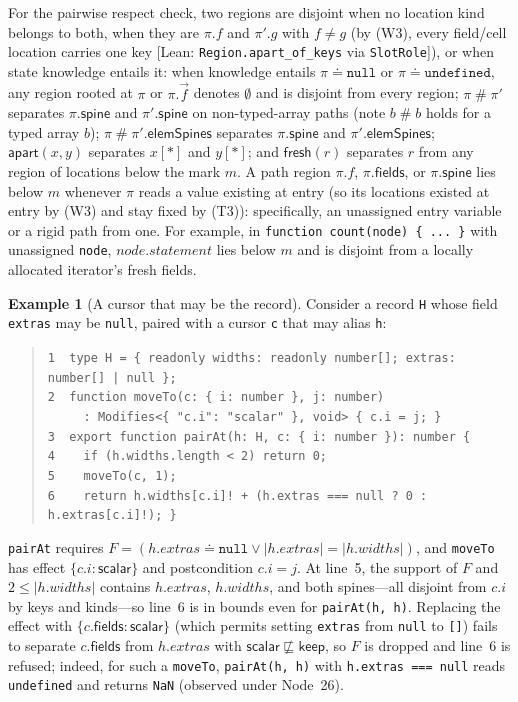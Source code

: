 \documentclass[10pt,a4paper]{article}
\theoremstyle{definition}
\newtheorem{example}[theorem]{Example}
\theoremstyle{remark}
\newcommand{\sep}{\mathrel{\#}}
\newcommand{\kw}[1]{\mathsf{#1}}
\newcommand{\keep}{\kw{keep}}
\newcommand{\fresh}{\kw{fresh}}
\newcommand{\apart}{\kw{apart}}
\newcommand{\len}[1]{|#1|}
\newcommand{\code}[1]{\texttt{#1}}
\newcommand{\lean}[1]{\texttt{\small #1}}
\newcommand{\status}[1]{\textsf{\small[#1]}}
\begin{document}
\noindent
For the pairwise respect check, two regions are disjoint when no location
kind belongs to both, when they are $\pi.f$ and $\pi'.g$ with $f\ne g$
(by (W3), every field/cell location carries one key
\status{Lean: \lean{Region.apart\_of\_keys} via \lean{SlotRole}}), or
when state knowledge entails it: when knowledge entails
$\pi\doteq\code{null}$ or $\pi\doteq\code{undefined}$, any region rooted
at $\pi$ or $\pi.\vec f$ denotes $\emptyset$ and is disjoint from every
region; $\pi\sep\pi'$ separates $\pi.\kw{spine}$ and $\pi'.\kw{spine}$ on
non-typed-array paths (note $b\sep b$ holds for a typed array $b$);
$\pi\sep\pi'.\kw{elemSpines}$ separates $\pi.\kw{spine}$ and
$\pi'.\kw{elemSpines}$; $\apart(x,y)$ separates $x[\ast]$ and $y[\ast]$;
and $\fresh(r)$ separates $r$ from any region of locations below the
mark $m$.
A path region $\pi.f$, $\pi.\kw{fields}$, or $\pi.\kw{spine}$ lies below
$m$ whenever $\pi$ reads a value existing at entry (so its locations
existed at entry by (W3) and stay fixed by (T3)): specifically, an
unassigned entry variable or a rigid path from one. For example, in
\code{function count(node) \{ ... \}} with unassigned \code{node},
$\mathit{node}.\mathit{statement}$ lies below $m$ and is disjoint from a
locally allocated iterator's fresh fields.

\begin{example}[A cursor that may be the record]\label{ex:key}
Consider a record \code{H} whose field \code{extras} may be \code{null},
paired with a cursor \code{c} that may alias \code{h}:
\begin{quote}\small
\code{1~~type H = \{ readonly widths: readonly number[]; extras: number[] | null \};}\\
\code{2~~function moveTo(c: \{ i: number \}, j: number)}\\
\code{~~~~~: Modifies<\{ "c.i": "scalar" \}, void> \{ c.i = j; \}}\\
\code{3~~export function pairAt(h: H, c: \{ i: number \}): number \{}\\
\code{4~~~~if (h.widths.length < 2) return 0;}\\
\code{5~~~~moveTo(c, 1);}\\
\code{6~~~~return h.widths[c.i]! + (h.extras === null ? 0 : h.extras[c.i]!); \}}
\end{quote}
\code{pairAt} requires
$F=(h.\mathit{extras}\doteq\code{null}\vee\len{h.\mathit{extras}}=\len{h.\mathit{widths}})$,
and \code{moveTo} has effect $\{c.i:\kw{scalar}\}$ and postcondition
$c.i=j$. At line~5, the support of $F$ and $2\le\len{h.\mathit{widths}}$
contains $h.\mathit{extras}$, $h.\mathit{widths}$, and both spines---all
disjoint from $c.i$ by keys and kinds---so line~6 is in bounds even for
\code{pairAt(h, h)}. Replacing the effect with
$\{c.\kw{fields}:\kw{scalar}\}$ (which permits setting \code{extras} from
\code{null} to \code{[]}) fails to separate $c.\kw{fields}$ from
$h.\mathit{extras}$ with $\kw{scalar}\not\sqsubseteq\keep$, so $F$ is
dropped and line~6 is refused; indeed, for such a \code{moveTo},
\code{pairAt(h, h)} with \code{h.extras === null} reads \code{undefined}
and returns \code{NaN} (observed under Node~26).
\end{example}
\end{document}
